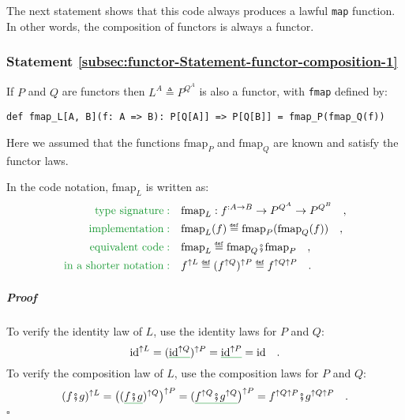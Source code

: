The next statement shows that this code always produces a lawful \lstinline!map!
function. In other words, the composition
of functors is always a functor.

\subsubsection{Statement \label{subsec:functor-Statement-functor-composition-1}\ref{subsec:functor-Statement-functor-composition-1}}

If $P$ and $Q$ are functors then $L^{A}\triangleq P^{Q^{A}}$ is
also a functor, with \lstinline!fmap! defined by:
\begin{lstlisting}
def fmap_L[A, B](f: A => B): P[Q[A]] => P[Q[B]] = fmap_P(fmap_Q(f))
\end{lstlisting}
Here we assumed that the functions $\text{fmap}_{P}$ and $\text{fmap}_{Q}$
are known and satisfy the functor laws.

In the code notation, $\text{fmap}_{L}$ is written as:
\begin{align}
{\color{greenunder}\text{type signature}:}\quad & \text{fmap}_{L}:f^{:A\rightarrow B}\rightarrow P^{Q^{A}}\rightarrow P^{Q^{B}}\quad,\nonumber \\
{\color{greenunder}\text{implementation}:}\quad & \text{fmap}_{L}(f)\triangleq\text{fmap}_{P}(\text{fmap}_{Q}(f))\quad,\nonumber \\
{\color{greenunder}\text{equivalent code}:}\quad & \text{fmap}_{L}\triangleq\text{fmap}_{Q}\bef\text{fmap}_{P}\quad,\\
{\color{greenunder}\text{in a shorter notation}:}\quad & f^{\uparrow L}\triangleq(f^{\uparrow Q})^{\uparrow P}\triangleq f^{\uparrow Q\uparrow P}\quad.\label{eq:def-functor-composition-fmap}
\end{align}


\subparagraph{Proof}

To verify the identity law of $L$, use the identity laws for $P$
and $Q$:
\[
\text{id}^{\uparrow L}=(\gunderline{\text{id}^{\uparrow Q}})^{\uparrow P}=\gunderline{\text{id}^{\uparrow P}}=\text{id}\quad.
\]
To verify the composition law of $L$, use the composition laws for
$P$ and $Q$:
\[
(f\bef g)^{\uparrow L}=\big((\gunderline{f\bef g})^{\uparrow Q}\big)^{\uparrow P}=(\gunderline{f^{\uparrow Q}\bef g^{\uparrow Q}}\big)^{\uparrow P}=f^{\uparrow Q\uparrow P}\bef g^{\uparrow Q\uparrow P}\quad.
\]
$\square$

